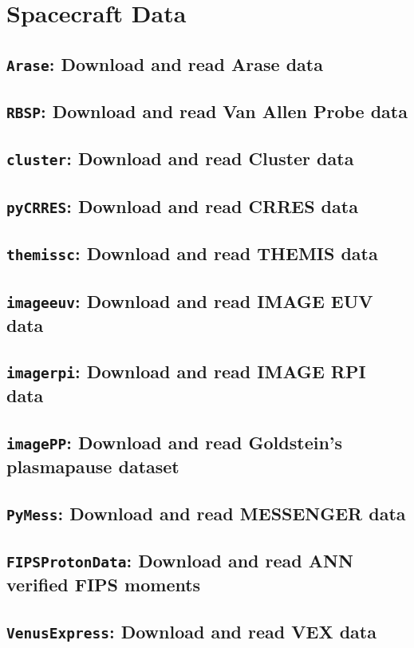 \chapter{Spacecraft Data}

	\section{\texttt{Arase}: Download and read Arase data}

	\section{\texttt{RBSP}: Download and read Van Allen Probe data}

	\section{\texttt{cluster}: Download and read Cluster data}

	\section{\texttt{pyCRRES}: Download and read CRRES data}

	\section{\texttt{themissc}:  Download and read THEMIS data}

	\section{\texttt{imageeuv}: Download and read IMAGE EUV data}

	\section{\texttt{imagerpi}: Download and read IMAGE RPI data}

	\section{\texttt{imagePP}: Download and read Goldstein's plasmapause dataset}


	\section{\texttt{PyMess}: Download and read MESSENGER data}

	\section{\texttt{FIPSProtonData}: Download and read ANN verified FIPS moments}

	\section{\texttt{VenusExpress}: Download and read VEX data}